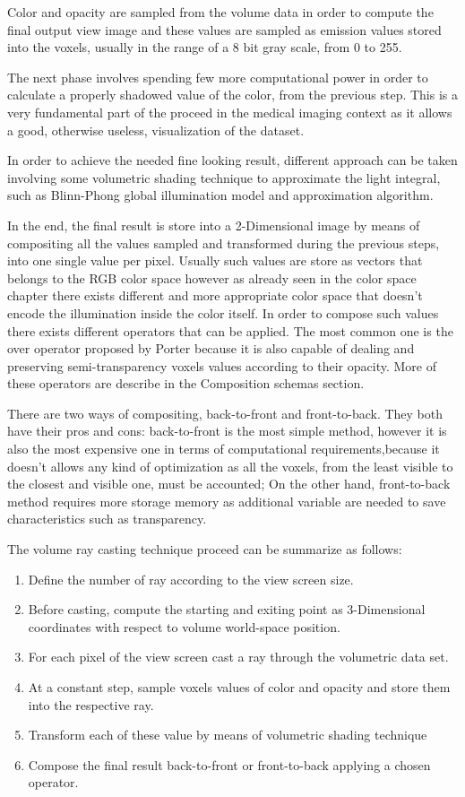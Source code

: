 \documentclass[10pt,a4paper]{article}
\begin{document}
Color and opacity are sampled from the volume data in order to compute the final output view image and these values are sampled as emission values stored into the voxels, usually in the range of a 8 bit gray scale, from 0 to 255.

The next phase involves spending few more computational power in order to calculate a properly shadowed value of the color, from the previous step. This is a very fundamental part of the proceed in the medical imaging context as it allows a good, otherwise useless, visualization of the dataset.

In order to achieve the needed fine looking result, different approach can be taken involving some volumetric shading technique to approximate the light integral, such as Blinn-Phong global illumination model and approximation algorithm.

In the end, the final result is store into a 2-Dimensional image by means of compositing all the values sampled and transformed during the previous steps, into one single value per pixel. Usually such values are store as vectors that belongs to the RGB color space%
however as already seen in the color space chapter there exists different and more appropriate color space that doesn't encode the illumination inside the color itself.
In order to compose such values there exists different operators that can be applied. The most common one is the over operator proposed by Porter%
because it is also capable of dealing and preserving semi-transparency voxels values according to their opacity. More of these operators are describe in the Composition schemas section.

There are two ways of compositing, back-to-front and front-to-back. They both have their pros and cons: back-to-front is the most simple method, however it is also the most expensive one in terms of computational requirements,because it doesn't allows any kind of optimization as all the voxels, from the least visible to the closest and visible one, must be accounted; On the other hand, front-to-back method requires more storage memory as additional variable are needed to save characteristics such as transparency.

The volume ray casting technique proceed can be summarize as follows:
\begin{enumerate}
\item Define the number of ray according to the view screen size.
\item Before casting, compute the starting and exiting point as 3-Dimensional coordinates with respect to volume world-space position.
\item For each pixel of the view screen cast a ray through the volumetric data set.
\item At a constant step, sample voxels values of color and opacity and store them into the respective ray.
\item Transform each of these value by means of volumetric shading technique
\item Compose the final result back-to-front or front-to-back applying a chosen operator.
\end{enumerate}
\end{document}

